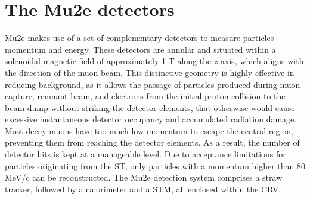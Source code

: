 \section{The Mu2e detectors}
Mu2e makes use of a set of complementary detectors to 
measure particles momentum and energy. These detectors 
are annular and situated within a solenoidal magnetic field of 
approximately 1 T along the $z$-axis, which aligns with 
the direction of the muon beam. This distinctive geometry 
is highly effective in reducing background, as it allows 
the passage of particles produced during muon capture, 
remnant beam, and electrons from the initial proton collision to the beam dump without striking
the detector elements, that otherwise would cause excessive instantaneous detector 
occupancy and accumulated radiation damage. 
Most decay muons have too much low momentum 
to escape the central region, preventing them from reaching the detector elements. 
As a result, the number of detector hits is kept at a manageable level. 
Due to acceptance limitations for particles originating from the ST, 
only particles with a momentum higher than 80 MeV/c can be reconstructed.
The Mu2e detection system comprises a straw tracker, followed by a 
calorimeter and a STM, all enclosed within the CRV.


